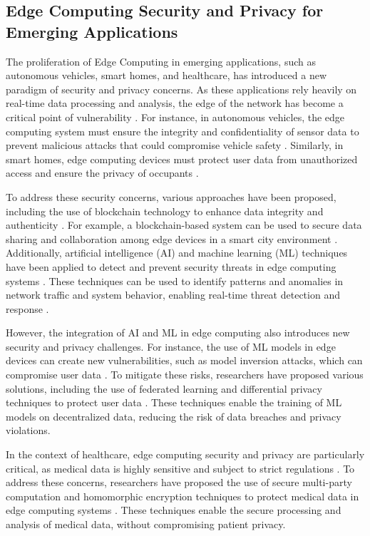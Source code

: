 \documentclass[11pt,a4paper]{article}
\begin{document}
\subsection{Edge Computing Security and Privacy for Emerging Applications}


The proliferation of Edge Computing in emerging applications, such as autonomous vehicles, smart homes, and healthcare, has introduced a new paradigm of security and privacy concerns. As these applications rely heavily on real-time data processing and analysis, the edge of the network has become a critical point of vulnerability \cite{arxiv:2004.07311}. For instance, in autonomous vehicles, the edge computing system must ensure the integrity and confidentiality of sensor data to prevent malicious attacks that could compromise vehicle safety \cite{arxiv:2012.11206}. Similarly, in smart homes, edge computing devices must protect user data from unauthorized access and ensure the privacy of occupants \cite{arxiv:2109.12983}.

To address these security concerns, various approaches have been proposed, including the use of blockchain technology to enhance data integrity and authenticity \cite{arxiv:2111.00416}. For example, a blockchain-based system can be used to secure data sharing and collaboration among edge devices in a smart city environment \cite{arxiv:2407.17314}. Additionally, artificial intelligence (AI) and machine learning (ML) techniques have been applied to detect and prevent security threats in edge computing systems \cite{arxiv:1709.08025}. These techniques can be used to identify patterns and anomalies in network traffic and system behavior, enabling real-time threat detection and response \cite{arxiv:2204.10282}.

However, the integration of AI and ML in edge computing also introduces new security and privacy challenges. For instance, the use of ML models in edge devices can create new vulnerabilities, such as model inversion attacks, which can compromise user data \cite{arxiv:2005.04563}. To mitigate these risks, researchers have proposed various solutions, including the use of federated learning and differential privacy techniques to protect user data \cite{arxiv:2407.04053}. These techniques enable the training of ML models on decentralized data, reducing the risk of data breaches and privacy violations.

In the context of healthcare, edge computing security and privacy are particularly critical, as medical data is highly sensitive and subject to strict regulations \cite{arxiv:2112.01250}. To address these concerns, researchers have proposed the use of secure multi-party computation and homomorphic encryption techniques to protect medical data in edge computing systems \cite{arxiv:1805.03591}. These techniques enable the secure processing and analysis of medical data, without compromising patient privacy.
\end{document}
